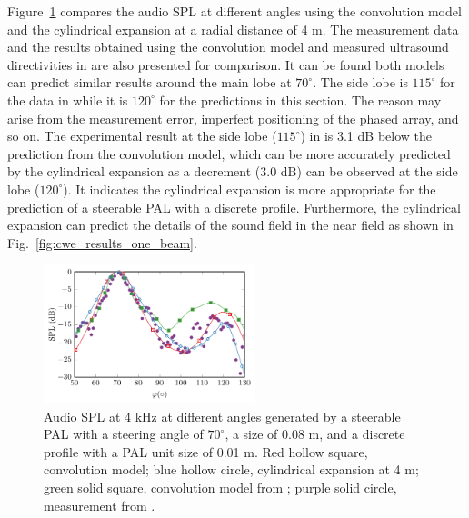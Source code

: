 Figure~\ref{fig:cwe_results_one_beam_diff_angle} compares the audio SPL at different angles using the convolution model and the cylindrical expansion at a radial distance of 4 m. 
The measurement data and the results obtained using the convolution model and measured ultrasound directivities in \cite{Shi2015ConvolutionModelComputing} are also presented for comparison. 
It can be found both models can predict similar results around the main lobe at $70^\circ$. 
The side lobe is $115^\circ$ for the data in \cite{Shi2015ConvolutionModelComputing} while it is $120^\circ$ for the predictions in this section. 
The reason may arise from the measurement error, imperfect positioning of the phased array, and so on. 
The experimental result at the side lobe ($115^\circ$) in \cite{Shi2015ConvolutionModelComputing} is 3.1 dB below the prediction from the convolution model, which can be more accurately predicted by the cylindrical expansion as a decrement (3.0 dB) can be observed at the side lobe ($120^\circ$). 
It indicates the cylindrical expansion is more appropriate for the prediction of a steerable PAL with a discrete profile. 
Furthermore, the cylindrical expansion can predict the details of the sound field in the near field as shown in Fig.~\ref{fig:cwe_results_one_beam}.

\begin{figure}[!htb]
    \centering
    \includegraphics[width = 0.55\textwidth]{fig/Shi2015JasaFig6_Directivity_Compare_v4_211014G.pdf}
    \caption{Audio SPL  at 4 kHz at different angles generated by a steerable PAL with a steering angle of \ensuremath{70^\circ}, a size of 0.08 m, and a discrete profile with a PAL unit size of 0.01 m.
    Red hollow square, convolution model; blue hollow circle, cylindrical expansion at 4 m; green solid square, convolution model from \cite{Shi2015ConvolutionModelComputing}; purple solid circle, measurement from \cite{Shi2015ConvolutionModelComputing}.}
    \label{fig:cwe_results_one_beam_diff_angle}
\end{figure}

